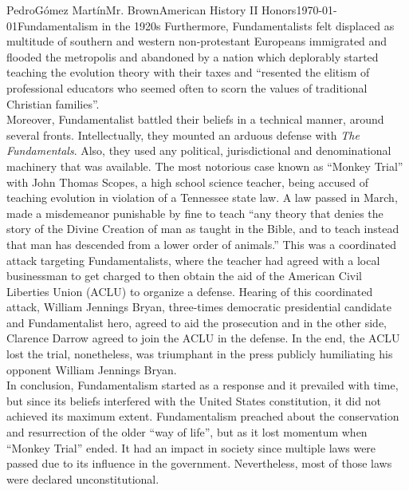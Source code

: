 \documentclass[12pt, letterpaper]{article}
\begin{document}
\begin{mla}{Pedro}{G\'{o}mez Mart\'{i}n}{Mr. Brown}{American History II Honors}{\today}{Fundamentalism in the 1920s}
  Furthermore, Fundamentalists felt displaced as multitude of southern and western non-protestant Europeans immigrated and flooded the metropolis and abandoned by a nation which deplorably started teaching the evolution theory with their taxes and “resented the elitism of professional educators who seemed often to scorn the values of traditional Christian families”.\parencite{RiseFundamentalism}\\
  Moreover, Fundamentalist battled their beliefs in a technical manner, around several fronts. Intellectually, they mounted an arduous defense with \textit{The Fundamentals}. Also, they used any political, jurisdictional and denominational machinery that was available. The most notorious case known as “Monkey Trial” with John Thomas Scopes, a high school science teacher, being accused of teaching evolution in violation of a Tennessee state law. A law passed in March, made a misdemeanor punishable by fine to teach “any theory that denies the story of the Divine Creation of man as taught in the Bible, and to teach instead that man has descended from a lower order of animals.”\parencite{MonkeyTrial} This was a coordinated attack targeting Fundamentalists, where the teacher had agreed with a local businessman to get charged to then obtain the aid of the American Civil Liberties Union (ACLU) to organize a defense. Hearing of this coordinated attack, William Jennings Bryan, three-times democratic presidential candidate and Fundamentalist hero, agreed to aid the prosecution and in the other side, Clarence Darrow agreed to join the ACLU in the defense. In the end, the ACLU lost the trial, nonetheless, was triumphant in the press publicly humiliating his opponent William Jennings Bryan.\\
  In conclusion, Fundamentalism started as a response and it prevailed with time, but since its beliefs interfered with the United States constitution, it did not achieved its maximum extent. Fundamentalism preached about the conservation and resurrection of the older ``way of life'', but as it lost momentum when ``Monkey Trial'' ended. It had an impact in society since multiple laws were passed due to its influence in the government. Nevertheless, most of those laws were declared unconstitutional.
\end{mla}
\printbibliography
\end{document}

